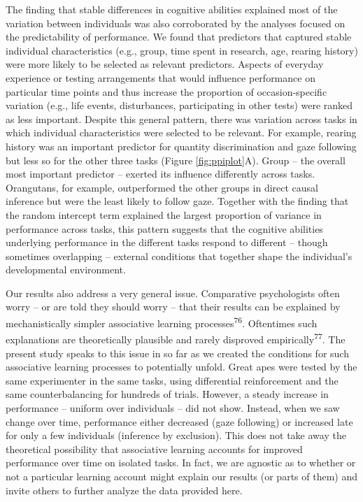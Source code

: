 \documentclass[
  man,floatsintext]{apa6}
\begin{document}
The finding that stable differences in cognitive abilities explained most of the variation between individuals was also corroborated by the analyses focused on the predictability of performance. We found that predictors that captured stable individual characteristics (e.g., group, time spent in research, age, rearing history) were more likely to be selected as relevant predictors. Aspects of everyday experience or testing arrangements that would influence performance on particular time points and thus increase the proportion of occasion-specific variation (e.g., life events, disturbances, participating in other tests) were ranked as less important. Despite this general pattern, there was variation across tasks in which individual characteristics were selected to be relevant. For example, rearing history was an important predictor for quantity discrimination and gaze following but less so for the other three tasks (Figure \ref{fig:ppiplot}A). Group -- the overall most important predictor -- exerted its influence differently across tasks. Orangutans, for example, outperformed the other groups in direct causal inference but were the least likely to follow gaze. Together with the finding that the random intercept term explained the largest proportion of variance in performance across tasks, this pattern suggests that the cognitive abilities underlying performance in the different tasks respond to different -- though sometimes overlapping -- external conditions that together shape the individual's developmental environment.

Our results also address a very general issue. Comparative psychologists often worry -- or are told they should worry -- that their results can be explained by mechanistically simpler associative learning processes\textsuperscript{76}. Oftentimes such explanations are theoretically plausible and rarely disproved empirically\textsuperscript{77}. The present study speaks to this issue in so far as we created the conditions for such associative learning processes to potentially unfold. Great apes were tested by the same experimenter in the same tasks, using differential reinforcement and the same counterbalancing for hundreds of trials. However, a steady increase in performance -- uniform over individuals -- did not show. Instead, when we saw change over time, performance either decreased (gaze following) or increased late for only a few individuals (inference by exclusion). This does not take away the theoretical possibility that associative learning accounts for improved performance over time on isolated tasks. In fact, we are agnostic as to whether or not a particular learning account might explain our results (or parts of them) and invite others to further analyze the data provided here.
\end{document}

